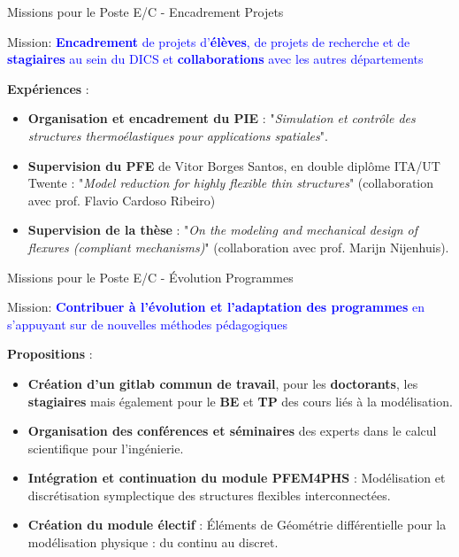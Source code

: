 \documentclass[aspectratio=169, french]{beamer}
\begin{document}
\begin{frame}{Missions pour le Poste E/C - Encadrement Projets}
	
	\begin{tcolorbox}
		Mission: \textcolor{blue}{\textbf{Encadrement} de projets d’\textbf{élèves}, de projets de recherche et de
		\textbf{stagiaires} au sein du DICS et \textbf{collaborations} avec les autres départements}
	\end{tcolorbox}

\textbf{Expériences} :
	\begin{itemize}
		\item \textbf{Organisation et encadrement du PIE} : "\textit{Simulation et contrôle des structures thermoélastiques pour applications spatiales}".
		\item \textbf{Supervision du PFE} de Vitor Borges Santos, en double diplôme ITA/UT Twente : "\textit{Model reduction for highly flexible thin structures}" (collaboration avec prof. Flavio Cardoso Ribeiro)
		\item \textbf{Supervision de la thèse} : "\textit{On the modeling and mechanical design of flexures (compliant mechanisms)}" (collaboration avec prof. Marijn Nijenhuis).
	\end{itemize}

\end{frame}


\begin{frame}{Missions pour le Poste E/C - Évolution Programmes}
	\begin{tcolorbox}
		Mission: \textcolor{blue}{\textbf{Contribuer à l’évolution et l’adaptation des programmes} en
		s’appuyant sur de nouvelles méthodes pédagogiques}
	\end{tcolorbox}

\textbf{Propositions} :

	
	\begin{itemize}
		\item \textbf{Création d'un gitlab commun de travail}, pour les \textbf{doctorants}, les \textbf{stagiaires} mais également pour le \textbf{BE} et \textbf{TP} des cours liés à la modélisation.
		\item \textbf{Organisation des conférences et séminaires} des experts dans le calcul scientifique pour l'ingénierie.
		\item \textbf{Intégration et continuation du module PFEM4PHS} : Modélisation et discrétisation symplectique des structures flexibles interconnectées.
		\item \textbf{Création du module électif} : Éléments de Géométrie différentielle pour la modélisation physique : du continu au discret.
	\end{itemize}
\end{frame}
\end{document}
